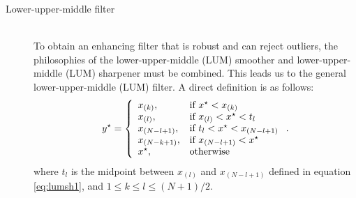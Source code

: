 \begin{description}
     \item[Lower-upper-middle filter] \ \\
To obtain an enhancing filter that is robust and can reject outliers,
the philosophies of the lower-upper-middle (LUM)
smoother and lower-upper-middle (LUM) sharpener must be
combined. This leads us to the general
lower-upper-middle (LUM) filter. A direct definition is
as follows: 
\begin{equation} 
  y^{\star} = \left\{
\begin{array}{ll} x_{(k)}, & \textrm{if $ x^{\star} < x_{(k)}$}\\ x_{(l)}, &
\textrm{if $ x_{(l)} < x^{\star} < t_l$}\\ x_{(N-l+1)}, & \textrm{if $ t_l <
x^{\star} < x_{(N-l+1)}$}\\ x_{(N-k+1)}, & \textrm{if $ x_{(N-l+1)} <
x^{\star}$}\\ x^{\star}, & \textrm{otherwise}
\end{array} \right..
  \label{eq:lum5} 
\end{equation}
where $t_l$ is the midpoint between $x_{(l)}$ and $x_{(N-l+1)}$
defined in equation
\ref{eq:lumsh1}, and  $1 \le k \le l \le (N+1)/2$.
\end{description}




%

